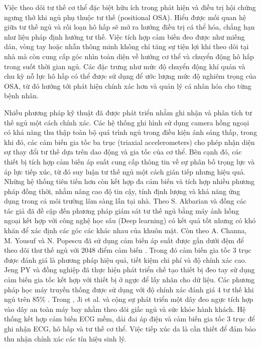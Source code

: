 Việc theo dõi tư thế cơ thể đặc biệt hữu ích trong phát hiện 
và điều trị hội chứng ngưng thở khi ngủ phụ thuộc tư thế (positional OSA).
Hiểu được mối quan hệ giữa tư thế ngủ và rối loạn hô hấp sẽ mở ra hướng điều trị cá thể hóa, 
chẳng hạn như liệu pháp định hướng tư thế. 
Việc tích hợp cảm biến đeo được như miếng dán, vòng tay hoặc 
nhẫn thông minh không chỉ tăng sự tiện lợi khi theo dõi tại nhà mà còn cung cấp góc 
nhìn toàn diện về hướng cơ thể và chuyển động hô hấp trong suốt thời gian ngủ. 
Các đặc trưng như mức độ chuyển động khí quản và chu kỳ nỗ lực hô hấp 
có thể được sử dụng để ước lượng mức độ nghiêm trọng của OSA, 
từ đó hướng tới phát hiện chính xác hơn và quản lý cá nhân hóa cho từng bệnh nhân.

Nhiều phương pháp kỹ thuật đã được phát triển nhằm ghi nhận và phân tích tư thế 
ngủ một cách chính xác. Các hệ thống ghi hình sử dụng camera hồng ngoại có khả năng 
thu thập toàn bộ quá trình ngủ trong điều kiện ánh sáng thấp, 
trong khi đó, các cảm biến gia tốc ba trục (triaxial accelerometers) 
cho phép nhận diện sự thay đổi tư thế dựa trên dao động và gia tốc của cơ thể. 
Bên cạnh đó, các thiết bị tích hợp cảm biến áp suất cung cấp thông tin về 
sự phân bố trọng lực và áp lực tiếp xúc, từ đó suy luận tư thế ngủ một cách gián tiếp 
nhưng hiệu quả. Những hệ thống tiên tiến hơn còn kết hợp đa cảm biến và 
tích hợp nhiều phương pháp đồng thời, nhằm nâng cao độ tin cậy, 
tính định lượng và khả năng ứng dụng trong cả môi trường lâm sàng lẫn tại nhà. 
Theo S. Akbarian và đồng các tác giả đã đề cập đến phương pháp giám sát tư 
thế ngủ bằng máy ảnh hồng ngoại kết hợp với công nghệ học sâu (Deep learning) 
\cite{Akbarian_osa} có kết quả tốt nhưng có khó khăn để xác định các góc các khác nhau của khuôn mặt. 
Còn theo A. Channa, M. Yousuf và N. Popescu đã sử dụng cảm biến áp suất được gắn dưới đệm để theo dõi 
thư thế ngủ với 2048 điểm cảm biến \cite{Channa_osa}. 
Trong đó cảm biến gia tốc 3 trục được đánh giá là phương pháp hiệu quả, 
tiết kiệm chi phí và độ chính xác cao. Jeng PY và đồng nghiệp đã thực hiện phát 
triển chế tạo thiết bị đeo tay sử dụng cảm biến gia tốc kết hợp với 
thiết bị ở ngực để lấy nhãn cho dữ liệu. Các phương pháp học máy truyền thống 
được sử dụng với độ chính xác đánh giá 4 tư thế khi ngủ trên 85\% \cite{Jeng}.
Trong \cite{ji2022airline}, Ji et al. và cộng sự phát triển một dây đeo ngực 
tích hợp vào dây an toàn máy bay nhằm theo dõi giấc ngủ và sức khỏe 
hành khách. Hệ thống kết hợp cảm biến ECG mềm, dải đai áp điện và 
cảm biến gia tốc 3 trục để ghi nhận ECG, hô hấp và tư thế cơ thể. 
Việc tiếp xúc da là cần thiết để đảm bảo thu nhận chính xác các tín 
hiệu sinh lý.

